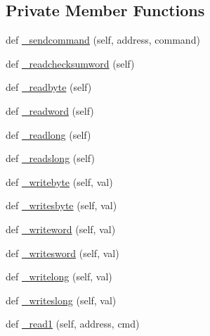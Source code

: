 \subsection*{Private Member Functions}
\begin{DoxyCompactItemize}
\item 
def \mbox{\hyperlink{classtoxic__hardware_1_1roboclaw__3_1_1Roboclaw_a6eeaf80eced8977d667baf023ff2a905}{\+\_\+sendcommand}} (self, address, command)
\item 
def \mbox{\hyperlink{classtoxic__hardware_1_1roboclaw__3_1_1Roboclaw_ae14e39969d97e2bd383910c901b593ff}{\+\_\+readchecksumword}} (self)
\item 
def \mbox{\hyperlink{classtoxic__hardware_1_1roboclaw__3_1_1Roboclaw_aaab6fa1b9720eb8b78d0d57a45c02032}{\+\_\+readbyte}} (self)
\item 
def \mbox{\hyperlink{classtoxic__hardware_1_1roboclaw__3_1_1Roboclaw_a8c648ca4e24d0a959c90677c8ac03e88}{\+\_\+readword}} (self)
\item 
def \mbox{\hyperlink{classtoxic__hardware_1_1roboclaw__3_1_1Roboclaw_a9e23af11d26d2d33dd658cb7a7b78928}{\+\_\+readlong}} (self)
\item 
def \mbox{\hyperlink{classtoxic__hardware_1_1roboclaw__3_1_1Roboclaw_af0ad830d41db11cc0dd7dec47587c519}{\+\_\+readslong}} (self)
\item 
def \mbox{\hyperlink{classtoxic__hardware_1_1roboclaw__3_1_1Roboclaw_a99730dc9e171fcb65808ececc0812606}{\+\_\+writebyte}} (self, val)
\item 
def \mbox{\hyperlink{classtoxic__hardware_1_1roboclaw__3_1_1Roboclaw_a5a9c4bb4e63148e6e869b7167c2a6a74}{\+\_\+writesbyte}} (self, val)
\item 
def \mbox{\hyperlink{classtoxic__hardware_1_1roboclaw__3_1_1Roboclaw_af2fb4548fa94ba05b6100a388dda3a9a}{\+\_\+writeword}} (self, val)
\item 
def \mbox{\hyperlink{classtoxic__hardware_1_1roboclaw__3_1_1Roboclaw_ac0300d32fed22af4c4f6209e55948945}{\+\_\+writesword}} (self, val)
\item 
def \mbox{\hyperlink{classtoxic__hardware_1_1roboclaw__3_1_1Roboclaw_a55b4350073a8309de410ec012ab43017}{\+\_\+writelong}} (self, val)
\item 
def \mbox{\hyperlink{classtoxic__hardware_1_1roboclaw__3_1_1Roboclaw_aaa5c516daee87007730a2a7d2e266ed5}{\+\_\+writeslong}} (self, val)
\item 
def \mbox{\hyperlink{classtoxic__hardware_1_1roboclaw__3_1_1Roboclaw_ae29c826e30e87b5e941189d47dc64561}{\+\_\+read1}} (self, address, cmd)

\end{DoxyCompactItemize}
